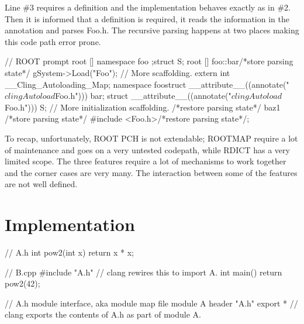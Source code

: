 \documentclass{webofc}
\begin{document}
Line \#3 requires a definition and the implementation behaves exactly as in \#2.
Then it is informed that a definition is required, it reads the information in
the annotation and parses Foo.h. The recursive parsing happens at two places
making this code path error prone.
\begin{listing}[h]
    \noindent
    \begin{minipage}[h]{.7\textwidth}
    \begin{cppcode*}{}
    // ROOT prompt
    root [] namespace foo { };struct S;
    root [] foo::bar/*store parsing state*/
        gSystem->Load("Foo");
        // More scaffolding.
        extern int __Cling_Autoloading_Map;
        namespace foo{struct __attribute__((annotate("$clingAutoload$Foo.h"))) bar;}
        struct __attribute__((annotate("$clingAutoload$Foo.h"))) S;
        // More initialization scaffolding.
        /*restore parsing state*/ baz1 /*store parsing state*/
        #include <Foo.h>/*restore parsing state*/;
 \end{cppcode*}
    \end{minipage}
\end{listing}

To recap, unfortunately, ROOT PCH is not extendable; ROOTMAP require a lot of
maintenance and goes on a very untested codepath, while RDICT has a very limited
scope. The three features require a lot of mechanisms to work together and the
corner cases are very many. The interaction between some of the features are
not well defined.

\section{Implementation}
\label{implementation}

\begin{listing}[h]
    \noindent
    \begin{minipage}[h]{.7\textwidth}
    \begin{cppcode*}{}
    // A.h
    int pow2(int x) {
      return x * x;
    }
    
    // B.cpp
    #include "A.h" // clang rewires this to import A.
    int main() {
      return pow2(42);
    }

    // A.h module interface, aka module map file
    module A {
      header "A.h"
      export * // clang exports the contents of A.h as part of module A.
    }
    \end{cppcode*}
    \end{minipage}
\end{listing}
\end{document}
